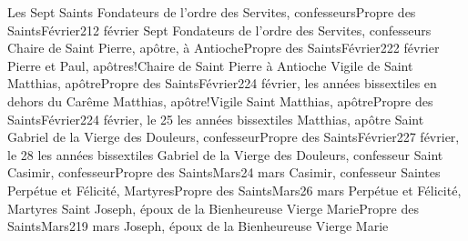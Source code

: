 \documentclass[twoside, french]{book}
\begin{document}
        {Les Sept Saints Fondateurs de l’ordre des Servites, confesseurs}{Propre des Saints}{Février}{2}{12 février}
        {}{}{Sept Fondateurs de l’ordre des Servites, confesseurs}{}{}
        {Chaire de Saint Pierre, apôtre, à Antioche}{Propre des Saints}{Février}{2}{22 février}
        {}{}{Pierre et Paul, apôtres!Chaire de Saint Pierre à Antioche}{}{}
        {Vigile de Saint Matthias, apôtre}{Propre des Saints}{Février}{2}{24 février, les années bissextiles en dehors du Carême}
        {}{}{Matthias, apôtre!Vigile}{}{}
        {Saint Matthias, apôtre}{Propre des Saints}{Février}{2}{24 février, le 25 les années bissextiles}
        {}{}{Matthias, apôtre}{}{}
        {Saint Gabriel de la Vierge des Douleurs, confesseur}{Propre des Saints}{Février}{2}{27 février, le 28 les années bissextiles}
        {}{}{Gabriel de la Vierge des Douleurs, confesseur}{}{}
        {Saint Casimir, confesseur}{Propre des Saints}{Mars}{2}{4 mars}
        {}{}{Casimir, confesseur}{}{}
        {Saintes Perpétue et Félicité, Martyres}{Propre des Saints}{Mars}{2}{6 mars}
        {}{}{Perpétue et Félicité, Martyres}{}{}
        {Saint Joseph, époux de la Bienheureuse Vierge Marie}{Propre des Saints}{Mars}{2}{19 mars}
        {}{}{Joseph, époux de la Bienheureuse Vierge Marie}{}{}
\end{document}
